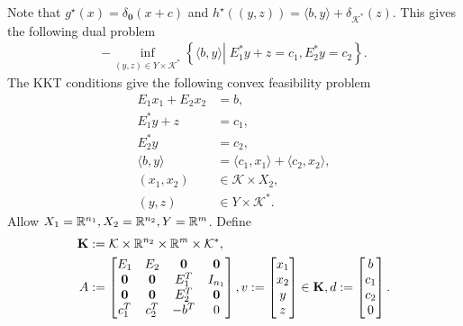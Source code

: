 \documentclass[12pt]{report}
\begin{document}
        Note that $g^\star(x) = \delta_{\mathbf 0}(x + c)$ and $h^\star((y, z)) = \langle b, y\rangle + \delta_{\mathcal K^*}(z)$. 
        This gives the following dual problem 
        \begin{align*}
            - \inf_{(y, z) \in Y \times \mathcal K^*} \left\lbrace
                \langle b, y\rangle 
                \left | \;
                    E_1^*y + z = c_1, 
                    E^*_2y = c_2
                \right.
            \right\rbrace. 
        \end{align*}
        The KKT conditions give the following convex feasibility problem 
        \begin{align*}
            E_1 x_1 + E_2 x_2 &= b, \\
            E_1^* y + z &= c_1, \\
            E_2^* y &= c_2, \\
            \langle b, y\rangle &= \langle c_1, x_1\rangle + \langle c_2, x_2\rangle, \\
            (x_1, x_2) &\in \mathcal K \times X_2, \\
            (y, z) &\in Y \times \mathcal K^*.
        \end{align*}
        Allow $X_1 = \mathbb R^{n_1}, X_2 = \mathbb R^{n_2}, Y = \mathbb R^m$. 
        Define 
        \begin{align*}
            \mathbf K &:= \mathcal K \times \mathbb R^{n_2} \times \mathbb R^m \times \mathcal K^*, 
            \\
            A &:= \begin{bmatrix}
                E_1 & E_2 & \mathbf 0 & \mathbf 0
                \\
                \mathbf 0 &\mathbf 0  & E_1^T & I_{n_1}
                \\
                \mathbf 0 &\mathbf 0  & E_2^T & \mathbf 0
                \\
                c_1^T & c_2^T & - b^T & 0
            \end{bmatrix}, 
            v := 
            \begin{bmatrix}
                x_1\\ x_2 \\ y \\ z \\
            \end{bmatrix} \in \mathbf K, 
            d := 
            \begin{bmatrix}
                b \\ c_1 \\ c_2 \\ 0
            \end{bmatrix}. 
        \end{align*}
\end{document}
